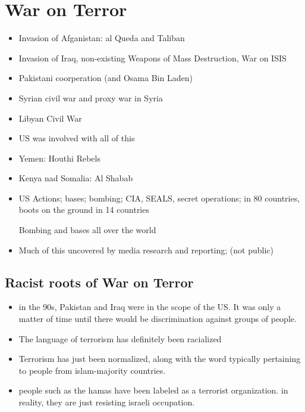 \documentclass{article}
\begin{document}
\section{War on Terror}
\begin{itemize}
  \item Invasion of Afganistan: al Queda and Taliban
  \item Invasion of Iraq, non-existing Weapons of Mass Destruction, War on ISIS
  \item Pakistani coorperation (and Osama Bin Laden)
  \item Syrian civil war and proxy war in Syria
  \item Libyan Civil War
  \item US was involved with all of this
  \item Yemen: Houthi Rebels
  \item Kenya nad Somalia: Al Shabab
  \item US Actions; bases; bombing; CIA, SEALS, secret operations;
    in 80 countries, boots on the ground in 14 countries

    Bombing and bases all over the world
  \item Much of this uncovered by media research and reporting; (not public)
\end{itemize}

\subsection{Racist roots of War on Terror}
\begin{itemize}
  \item in the 90s, Pakistan and Iraq were in the scope of the US.
    It was only a matter of time until there would be discrimination against
    groups of people.
  \item The language of terrorism has definitely been racialized
  \item Terrorism has just been normalized, along with the word
    typically pertaining to people from islam-majority countries.
  \item people such as the hamas have been labeled as a terrorist organization.
    in reality, they are just resisting israeli occupation.
\end{itemize}
\end{document}
